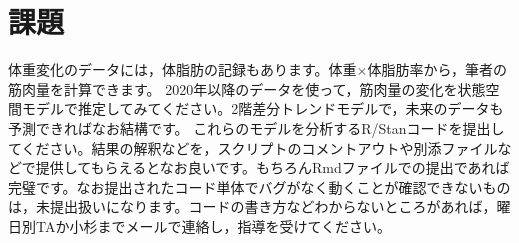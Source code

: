 \documentclass{ltjsbook}
\begin{document}
\section{課題}
体重変化のデータには，体脂肪の記録もあります。体重$\times$体脂肪率から，筆者の筋肉量を計算できます。
2020年以降のデータを使って，筋肉量の変化を状態空間モデルで推定してみてください。2階差分トレンドモデルで，未来のデータも予測できればなお結構です。
これらのモデルを分析するR/Stanコードを提出してください。結果の解釈などを，スクリプトのコメントアウトや別添ファイルなどで提供してもらえるとなお良いです。もちろんRmdファイルでの提出であれば完璧です。なお提出されたコード単体でバグがなく動くことが確認できないものは，未提出扱いになります。コードの書き方などわからないところがあれば，曜日別TAか小杉までメールで連絡し，指導を受けてください。
\end{document}
